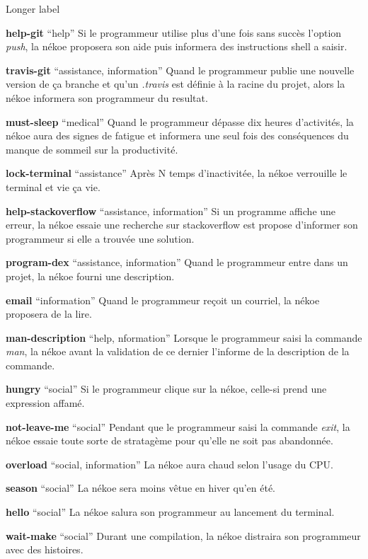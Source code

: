 \documentclass{report}
\begin{document}
\begin{labeling}{Longer label\quad}
    \item[\textbf{help-git} \enquote{help}] Si le programmeur utilise plus d'une fois sans succès l'option \textit{push}, la nékoe proposera son aide puis informera des instructions shell a saisir.
	\item[\textbf{travis-git} \enquote{assistance, information}] Quand le programmeur publie une nouvelle version de ça branche et qu'un \textit{.travis} est définie à la racine du projet, alors la nékoe informera son programmeur du resultat.
    \item[\textbf{must-sleep} \enquote{medical}] Quand le programmeur dépasse dix heures d'activités, la nékoe aura des signes de fatigue et informera une seul fois des conséquences du manque de sommeil sur la productivité.
    \item[\textbf{lock-terminal} \enquote{assistance}] Après N temps d'inactivitée, la nékoe verrouille le terminal et vie ça vie.
	\item[\textbf{help-stackoverflow} \enquote{assistance, information}] Si un programme affiche une erreur, la nékoe essaie une recherche sur stackoverflow est propose d'informer son programmeur si elle a trouvée une solution.
	\item[\textbf{program-dex} \enquote{assistance, information}] Quand le programmeur entre dans un projet, la nékoe fourni une description.
	\item[\textbf{email} \enquote{information}] Quand le programmeur reçoit un courriel, la nékoe proposera de la lire.
	\item[\textbf{man-description} \enquote{help, nformation}] Lorsque le programmeur saisi la commande \textit{man}, la nékoe avant la validation de ce dernier l'informe de la description de la commande.
	\item[\textbf{hungry} \enquote{social}] Si le programmeur clique sur la nékoe, celle-si prend une expression affamé.
	\item[\textbf{not-leave-me} \enquote{social}] Pendant que le programmeur saisi la commande \textit{exit}, la nékoe essaie toute sorte de stratagème pour qu'elle ne soit pas abandonnée.
	\item[\textbf{overload} \enquote{social, information}] La nékoe aura chaud selon l'usage du CPU.
	\item[\textbf{season} \enquote{social}] La nékoe sera moins vêtue en hiver qu'en été.
	\item[\textbf{hello} \enquote{social}] La nékoe salura son programmeur au lancement du terminal.
	\item[\textbf{wait-make} \enquote{social}] Durant une compilation, la nékoe distraira son programmeur avec des histoires.
\end{labeling}
\end{document}
